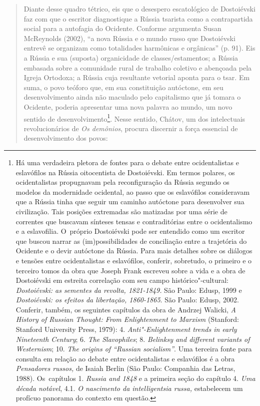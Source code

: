 {\begin{quote}
Diante desse quadro tétrico, eis que o desespero escatológico de
Dostoiévski faz com que o escritor diagnostique a Rússia tsarista como a
contrapartida social para a autofagia do Ocidente. Conforme argumenta
Susan McReynolds (2002), ``a nova Rússia e o mundo russo que Dostoiévski
entrevê se organizam como totalidades harmônicas e orgânicas'' (p. 91).
Eis a Rússia e sua (suposta) organicidade de classes/estamentos; a
Rússia embasada sobre a comunidade rural de trabalho coletivo e
abençoada pela Igreja Ortodoxa; a Rússia cuja resultante vetorial aponta
para o tsar. Em suma, o povo teóforo que, em sua constituição autóctone,
em seu desenvolvimento ainda não maculado pelo capitalismo que já tomara
o Ocidente, poderia apresentar uma nova palavra ao mundo, um novo
sentido de desenvolvimento\footnote{Há uma verdadeira pletora de fontes
  para o debate entre ocidentalistas e eslavófilos na Rússia
  oitocentista de Dostoiévski. Em termos polares, os ocidentalistas
  propugnavam pela reconfiguração da Rússia segundo os modelos da
  modernidade ocidental, ao passo que os eslavófilos consideravam que a
  Rússia tinha que seguir um caminho autóctone para desenvolver sua
  civilização. Tais posições extremadas são matizadas por uma série de
  correntes que buscavam sínteses tensas e contraditórias entre o
  ocidentalismo e a eslavofilia. O~próprio Dostoiévski pode ser
  entendido como um escritor que buscou narrar as (im)possibilidades de
  conciliação entre a trajetória do Ocidente e o devir autóctone da
  Rússia. Para mais detalhes sobre os diálogos e tensões entre
  ocidentalistas e eslavófilos, conferir, sobretudo, o primeiro e o
  terceiro tomos da obra que Joseph Frank escreveu sobre a vida e a obra
  de Dostoiévski em estreita correlação com seu campo
  histórico"-cultural: \emph{Dostoiévski: as sementes da revolta,
  1821-1849.} São Paulo: Edusp, 1999 e \emph{Dostoiévski: os efeitos da
  libertação, 1860-1865}. São Paulo: Edusp, 2002. Conferir, também, os
  seguintes capítulos da obra de Andrzej Walicki, \emph{A History of
  Russian Thought: From Enlightenment to Marxism} (Stanford: Stanford
  University Press, 1979): 4. \emph{Anti"-Enlightenment trends in early
  Nineteenth Century}; 6. \emph{The Slavophiles}; 8. \emph{Belinksy and
  different variants of Westernism}; 10. \emph{The origins of ``Russian
  socialism''}. Uma terceira fonte para consulta em relação ao debate
  entre ocidentalistas e eslavófilos é a obra \emph{Pensadores russos,}
  de Isaiah Berlin (São Paulo: Companhia das Letras, 1988). Os~capítulos
  1. \emph{Russia and 1848} e a primeira seção do capítulo 4. \emph{Uma
  década notável}, 4.1. \emph{O nascimento da intelligentsia russa,}
  estabelecem um profícuo panorama do contexto em questão.}. Nesse
sentido, Chátov, um dos intelectuais revolucionários de \emph{Os
demônios}, procura discernir a força essencial de desenvolvimento dos
povos:


\end{quote}}
